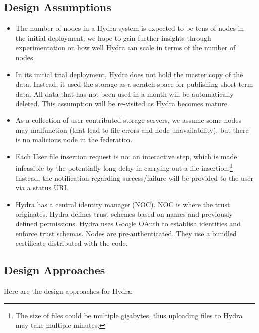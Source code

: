 \subsection{Design Assumptions}
\begin{itemize}
\item The number of nodes in a Hydra system is expected to be tens of nodes in the initial deployment; we hope to gain further insights through experimentation on how well Hydra can scale in terms of the number of nodes.

\item In its initial trial deployment, Hydra does not hold the master copy of the data. Instead, it used the storage as a scratch space for publishing short-term data. All data that has not been used in a month will be automatically deleted. This assumption will be re-visited as Hydra becomes mature.
    
\item As a collection of user-contributed storage servers, we assume some nodes may malfunction (that lead to file errors and node unavailability), but there is no malicious node in the federation.

\item Each User file insertion request is not an interactive step, which is made infeasible by the potentially long delay in carrying out a file insertion.\footnote{The size of files could be multiple gigabytes, thus uploading files to Hydra may take multiple minutes.} 
Instead, the notification regarding success/failure will be provided to the user via a status URI. 
    
\item Hydra has a central identity manager (NOC). NOC is where the trust originates. Hydra defines trust schemes based on names and previously defined permissions. Hydra uses Google OAuth to establish identities and enforce trust schemas. Nodes are pre-authenticated. They use a bundled certificate distributed with the code.
\end{itemize}

\subsection{Design Approaches} \label{subsec:design-approach}
Here are the design approaches for Hydra:

